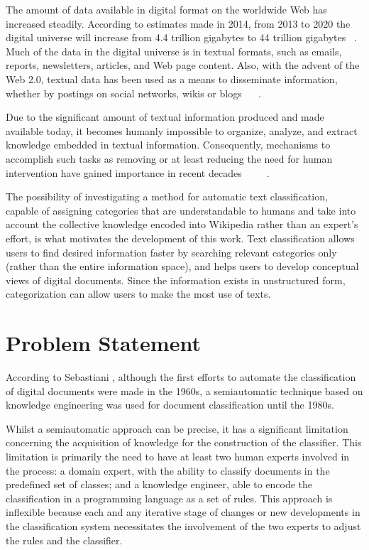 The amount of data available in digital format on the worldwide Web has increased steadily. According to estimates made in 2014, from 2013 to 2020 the digital universe will increase from 4.4 trillion gigabytes to 44 trillion gigabytes ~\cite{turner2014digital}. Much of the data in the digital universe is in textual formats, such as emails, reports, newsletters, articles, and Web page content. Also, with the advent of the Web 2.0, textual data has been used as a means to disseminate information, whether by postings on social networks, wikis or blogs ~\cite{fuchs2013internet} ~\cite{o2009web}.

Due to the significant amount of textual information produced and made available today, it becomes humanly impossible to organize, analyze, and extract knowledge embedded in textual information. Consequently, mechanisms to accomplish such tasks as removing or at least reducing the need for human intervention have gained importance in recent decades ~\cite{feldman2007text} ~\cite{berry2010text} ~\cite{aggarwal2012mining}. 

The possibility of investigating a method for automatic text classification, capable of assigning categories that are understandable to humans and take into account the collective knowledge encoded into Wikipedia rather than an expert's effort, is what motivates the development of this work. Text classification allows users to find desired information faster by searching relevant categories only (rather than the entire information space), and helps users to develop conceptual views of digital documents. Since the information exists in unstructured form, categorization can allow users to make the most use of texts. 



\section{\hspace*{3pt}Problem Statement}


According to Sebastiani \cite{Sebastiani:2002}, although the first efforts to automate the classification of digital documents were made in the 1960s, a semiautomatic technique based on knowledge engineering was used for document classification until the 1980s.

Whilst a semiautomatic approach can be precise, it has a significant limitation concerning the acquisition of knowledge for the construction of the classifier. This limitation is primarily the need to have at least two human experts involved in the process: a domain expert, with the ability to classify documents in the predefined set of classes; and a knowledge engineer, able to encode the classification in a programming language as a set of rules. This approach is inflexible because each and any iterative stage of changes or new developments in the classification system necessitates the involvement of the two experts to adjust the rules and the classifier. 

